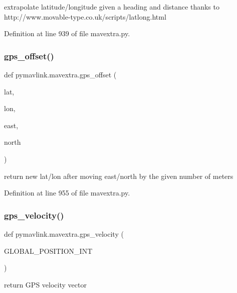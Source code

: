 \begin{DoxyVerb}extrapolate latitude/longitude given a heading and distance
thanks to http://www.movable-type.co.uk/scripts/latlong.html
\end{DoxyVerb}
 

Definition at line 939 of file mavextra.\+py.

\mbox{\label{namespacepymavlink_1_1mavextra_ac5d6283932b9abee57818ce1c5a8b2c2}} 
\subsubsection{\texorpdfstring{gps\_offset()}{gps\_offset()}}
{\footnotesize\ttfamily def pymavlink.\+mavextra.\+gps\+\_\+offset (\begin{DoxyParamCaption}\item[{}]{lat,  }\item[{}]{lon,  }\item[{}]{east,  }\item[{}]{north }\end{DoxyParamCaption})}

\begin{DoxyVerb}return new lat/lon after moving east/north
by the given number of meters\end{DoxyVerb}
 

Definition at line 955 of file mavextra.\+py.

\mbox{\label{namespacepymavlink_1_1mavextra_a42f6635bebc5b76277d38e5dcbdd8c4f}} 
\subsubsection{\texorpdfstring{gps\_velocity()}{gps\_velocity()}}
{\footnotesize\ttfamily def pymavlink.\+mavextra.\+gps\+\_\+velocity (\begin{DoxyParamCaption}\item[{}]{G\+L\+O\+B\+A\+L\+\_\+\+P\+O\+S\+I\+T\+I\+O\+N\+\_\+\+I\+NT }\end{DoxyParamCaption})}

\begin{DoxyVerb}return GPS velocity vector\end{DoxyVerb}
 

